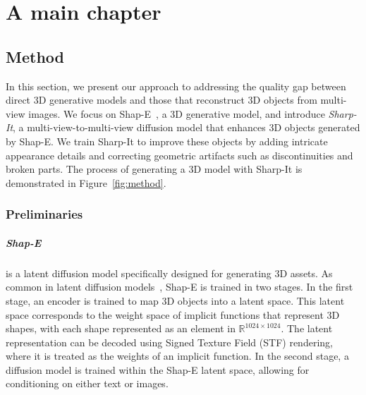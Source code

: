 \chapter{A main chapter}
\label{chap:firstchap}

\section{Method}
In this section, we present our approach to addressing the quality gap between direct 3D generative models and those that reconstruct 3D objects from multi-view images.
We focus on Shap-E~\cite{jun2023shape}, a 3D generative model, and introduce \emph{Sharp-It}, a multi-view-to-multi-view diffusion model that enhances 3D objects generated by Shap-E. We train Sharp-It to improve these objects by adding intricate appearance details and correcting geometric artifacts such as discontinuities and broken parts.
The process of generating a 3D model with Sharp-It is demonstrated in Figure~\ref{fig:method}.

\subsection{Preliminaries}

\paragraph{Shap-E} 
is a latent diffusion model specifically designed for generating 3D assets. As common in latent diffusion models~\cite{rombach2022highresolutionimagesynthesislatent}, Shap-E is trained in two stages. In the first stage, an encoder is trained to map 3D objects into a latent space. This latent space corresponds to the weight space of implicit functions that represent 3D shapes, with each shape represented as an element in $\mathbb{R}^{1024\times1024}$. The latent representation can be decoded using Signed Texture Field (STF) rendering, where it is treated as the weights of an implicit function.
In the second stage, a diffusion model is trained within the Shap-E latent space, allowing for conditioning on either text or images.


